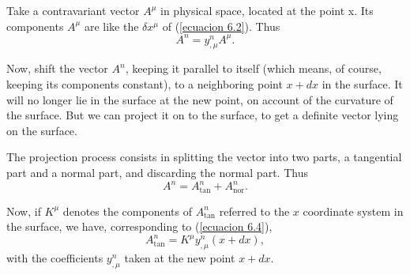 Take a contravariant vector $A^\mu$ in physical space, located at the point x. 
Its components $A^\mu$ are like the $\delta x^\mu$ of (\ref{ecuacion 6.2}). Thus
\begin{equation}
 \label{ecuacion 6.4}
 A^n = y^n_{,\mu}A^\mu.
\end{equation}

Now, shift the vector $A^n$, keeping it parallel to itself (which means, of 
course, keeping its components constant), to a neighboring point $x + dx$ in the 
surface. It will no longer lie in the surface at the new point, on account of 
the curvature of the surface. But we can project it on to the surface, to get a 
definite vector lying on the surface.

The projection process consists in splitting the vector into two parts, a 
tangential part and a normal part, and discarding the normal part. Thus
\begin{equation}
 \label{ecuacion 6.5}
 A^n = A^n_{\mbox{tan}} + A^n_{\mbox{nor}}.
\end{equation}

Now, if $K^\mu$ denotes the components of $A^n_{\mbox{tan}}$ referred to the 
$x$ coordinate system in the surface, we have, corresponding to (\ref{ecuacion 
6.4}),
\begin{equation}
 \label{ecuacion 6.6}
 A^n_{\mbox{tan}} = K^\mu y^n_{,\mu}(x + dx),
\end{equation}
with the coefficients $y^n_{,\mu}$ taken at the new point $x+ dx$.

